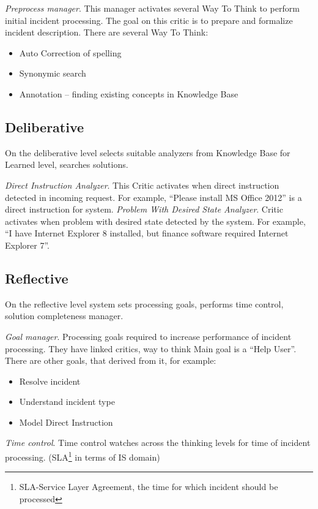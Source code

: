 \documentclass{llncs}
\begin{document}
\emph{Preprocess manager}. This manager activates several Way To Think to perform initial incident processing. The goal on this critic is to prepare and formalize incident description. There are several Way To Think:
\begin{itemize}
 \item Auto Correction of spelling
 \item Synonymic search
 \item Annotation – finding existing concepts in Knowledge Base
\end{itemize}

\subsection{Deliberative}

On the deliberative level selects suitable analyzers from Knowledge Base for Learned level, searches solutions.

\emph{Direct Instruction Analyzer}. This Critic activates when direct instruction detected in incoming request. For example, “Please install MS Office 2012” is a direct instruction for system.
\emph{Problem With Desired State Analyzer}. Critic activates when problem with desired state detected by the system. For example, “I have Internet Explorer 8 installed, but finance software required Internet Explorer 7”.

\subsection{Reflective}

On the reflective level system sets processing goals, performs time control, solution completeness manager.

\emph{Goal manager}. Processing goals required to increase performance of incident processing. They have linked critics, way to think Main goal is a “Help User”. There are other goals, that derived from it, for example:
\begin{itemize}
 \item Resolve incident
 \item Understand incident type
 \item Model Direct Instruction
\end{itemize}

\emph{Time control}. Time control watches across the thinking levels for time of incident processing. (SLA\footnote{SLA-Service Layer Agreement, the time for which incident should be processed} in terms of IS domain)
\end{document}
